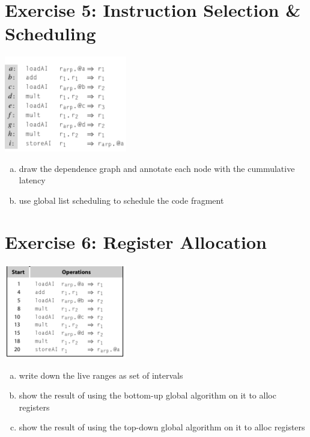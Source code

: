\documentclass[a4paper]{article}
\begin{document}
	\section*{Exercise 5: Instruction Selection \& Scheduling}\label{sec:exercise5} 
	\includegraphics[keepaspectratio,width=0.4\textwidth]{exam_img/iloc_0_0}
\begin{enumerate}[a.]
	\item draw the dependence graph and annotate each node with the cummulative latency
	\item use global list scheduling to schedule the code fragment
\end{enumerate}

	\section*{Exercise 6: Register Allocation}\label{sec:exercise6}
	\includegraphics[keepaspectratio,width=0.4\textwidth]{exam_img/iloc_0_1}
\begin{enumerate}[a.]
	\item write down the live ranges as set of intervals
	\item show the result of using the bottom-up global algorithm on it to alloc registers
	\item show the result of using the top-down global algorithm on it to alloc registers
\end{enumerate}
\end{document}
